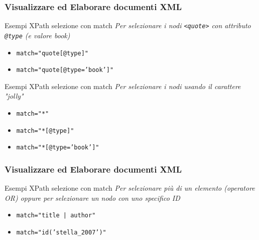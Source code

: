 \begin{frame}
    \frametitle{Visualizzare ed Elaborare documenti XML}
    \addtocounter{nframe}{1}
    

    \begin{block}{Esempi XPath selezione con match}
        \emph{Per selezionare i nodi \texttt{<quote>} con attributo \texttt{@type} (e valore \textit{book})}
        \begin{itemize}
            \item \texttt{match="quote[@type]"}
            \item \texttt{match="quote[@type='book']"}
        \end{itemize}
        
    \end{block}
     
    \begin{block}{Esempi XPath selezione con match}
        \emph{Per selezionare i nodi usando il carattere "jolly"}
        \begin{itemize}
            \item \texttt{match="*"}
            \item \texttt{match="*[@type]"}
            \item \texttt{match="*[@type='book']"}
        \end{itemize}
    \end{block}
    
\end{frame}


\begin{frame}
    \frametitle{Visualizzare ed Elaborare documenti XML}
    \addtocounter{nframe}{1}
    

    \begin{block}{Esempi XPath selezione con match}
        \emph{Per selezionare più di un elemento (operatore OR) oppure per selezionare un nodo con uno specifico ID}
        \begin{itemize}
            \item \texttt{match="title | author"}
            \item \texttt{match="id('stella_2007’)"}
        \end{itemize}
        
    \end{block}
    
\end{frame}

